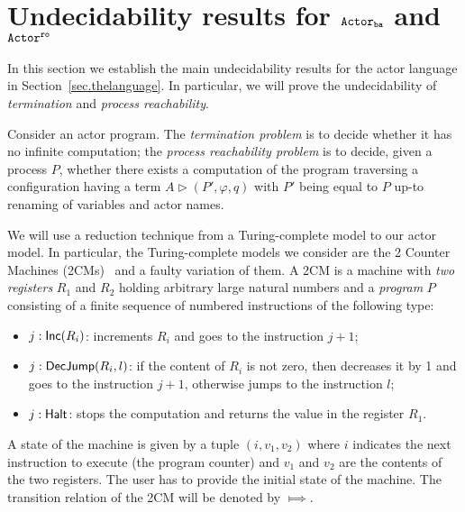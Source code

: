 \documentclass{LMCS}
\theoremstyle{plain}\newtheorem{proposition}[thm]{Proposition}
\theoremstyle{plain}\newtheorem{lemma}[thm]{Lemma}
\theoremstyle{plain}\newtheorem{theorem}[thm]{Theorem}
\theoremstyle{plain}\newtheorem{corollary}[thm]{Corollary}
\newcommand{\actro}{${\tt Actor^{\tt ro}}$}
\newcommand{\actba}{${\tt Actor_{\tt ba}}$}
\begin{document}
\section{Undecidability results for {\actba} and {\actro}}
\label{sec.undecidability}
In this section we establish the main undecidability results 
for the actor language in Section~\ref{sec.thelanguage}.
In particular, we will prove the undecidability of \emph{termination}
and \emph{process reachability}. 

\begin{defi}
\label{def.termandreach}
Consider an actor program.
The \emph{termination problem} is to decide whether it has no infinite computation;
the \emph{process reachability problem} is to decide,
given a process $P$, whether there exists  a computation of the program
traversing a configuration having a term $A \triangleright (P', \varphi, q)$
with $P'$ being equal
to $P$ up-to renaming of variables and actor names.
\end{defi}



We will use a reduction technique 
from a Turing-complete model to our actor model.
In particular, the Turing-complete models we consider are the 2 Counter Machines 
(2CMs)~\cite{Minsky67}
and a faulty variation of them.
A 2CM  is a machine with \emph{two registers} 
$R_1$ and $R_2$ holding arbitrary large natural numbers and a 
\emph{program} $P$ consisting of a finite sequence of numbered 
instructions of the following type:
\begin{itemize}
 \item $j: {\sf Inc}(R_i)$: increments $R_i$ 
 and goes to the instruction $j+1$;
 \item $j: {\sf DecJump}(R_i, l)$: if the content of $R_i$ is not 
 zero, then decreases it by 1 and goes to the instruction $j+1$, otherwise jumps to the instruction $l$;
 \item $j: {\sf Halt}$: stops the computation and returns the value in 
 the register $R_1$.
\end{itemize}
A state of the machine is given by a tuple $(i, v_1, v_2)$ where 
$i$ indicates the next instruction to execute (the program counter)
and $v_1$ and $v_2$ are the contents of the two registers. The
user has to provide the initial state of the machine. 
The transition relation of the 2CM will be denoted by $\Longmapsto$.
\end{document}
